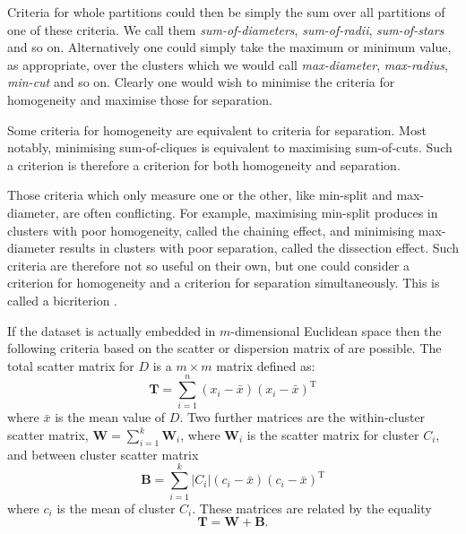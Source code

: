 \documentclass[a4paper]{report}
\newcommand{\dset}{D}
\begin{document}
Criteria for whole partitions could then be simply the sum over all partitions
of one of these criteria.  We call them \textit{sum-of-diameters},
\textit{sum-of-radii}, \textit{sum-of-stars} and so on.  Alternatively one
could simply take the maximum or minimum value, as appropriate, over the
clusters which we would call \textit{max-diameter}, \textit{max-radius},
\textit{min-cut} and so on.  Clearly one would wish to minimise the criteria
for homogeneity and maximise those for separation.

Some criteria for homogeneity are equivalent to criteria for separation.  Most
notably, minimising sum-of-cliques is equivalent to maximising sum-of-cuts.
Such a criterion is therefore a criterion for both homogeneity and separation.

Those criteria which only measure one or the other, like min-split and
max-diameter, are often conflicting.  For example, maximising min-split
produces in clusters with poor homogeneity, called the chaining effect, and
minimising max-diameter results in clusters with poor separation, called the
dissection effect.  Such criteria are therefore not so useful on their own,
but one could consider a criterion for homogeneity and a criterion for
separation simultaneously.  This is called a bicriterion
\citep{delattre1980bicriterion}.

If the dataset is actually embedded in $m$-dimensional Euclidean space then
the following criteria based on the scatter or dispersion matrix of
\citet{wilks60} are possible.  The total scatter matrix for $\dset$ is a $m
\times m$ matrix defined
as:
\begin{equation*}
  \mathbf{T} = \sum_{i=1}^{n} (x_i - \bar{x})(x_i - \bar{x})^{\mathrm{T}}
\end{equation*}
where $\bar{x}$ is the mean value of $\dset$.  Two further matrices are
the within-cluster scatter matrix, $\mathbf{W} = \sum_{i=1}^{k} \mathbf{W}_i$,
where $\mathbf{W}_i$ is the scatter matrix for cluster $C_i$, and between
cluster scatter matrix
\begin{equation*}
  \mathbf{B} =
  \sum_{i=1}^{k} |C_i| (c_i - \bar{x}) (c_i - \bar{x})^{\mathrm{T}}
\end{equation*}
where $c_i$ is the mean of cluster $C_i$.  These matrices are related by the
equality
\begin{equation*}
  \mathbf{T} = \mathbf{W} + \mathbf{B}.
\end{equation*}
\end{document}
